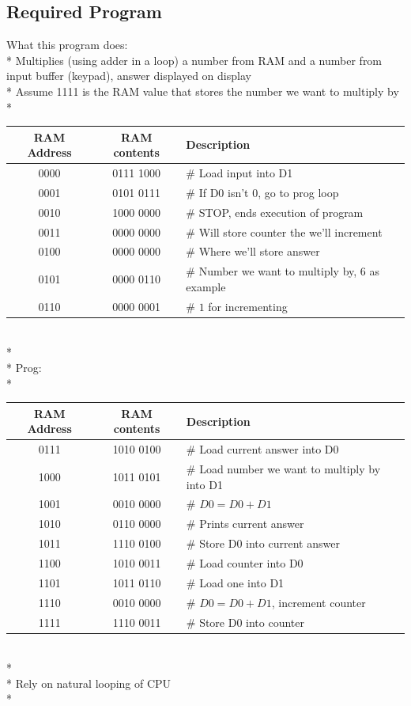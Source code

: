 \documentclass{article}
\begin{document}
	\subsection{Required Program}
	What this program does:
	\\*  Multiplies (using adder in a loop) a number from RAM and a number from input buffer (keypad), answer displayed on display
	\\* Assume 1111 is the RAM value that stores the number we want to multiply by
	\\*
	\begin{tabular}{|c|c|l|}
	\hline \textbf{RAM Address} & \textbf{RAM contents} & \textbf{Description}
	\\* \hline 	0000	& 0111 1000 & \# Load input into D1
	\\* \hline 	0001	& 0101 0111 & \# If D0 isn't $0$, go to prog loop
	\\* \hline 	0010	& 1000 0000 & \# STOP, ends execution of program
	\\* \hline 	0011	& 0000 0000 & \# Will store counter the we'll increment
	\\* \hline 	0100	& 0000 0000 & \# Where we'll store answer
	\\* \hline 	0101	& 0000 0110 & \# Number we want to multiply by, 6 as example
	\\* \hline 	0110	& 0000 0001 & \# $1$ for incrementing
	\\ \hline
	\end{tabular}
	\\*
	\\* Prog:
	\\*
	\begin{tabular}{|c|c|l|}
	\hline \textbf{RAM Address} & \textbf{RAM contents} & \textbf{Description}
	\\* \hline 	0111	& 1010 0100 & \# Load current answer into D0
	\\* \hline 	1000	& 1011 0101 & \# Load number we want to multiply by into D1
	\\* \hline 	1001	& 0010 0000 & \# $D0=D0+D1$
	\\* \hline 	1010	& 0110 0000 & \# Prints current answer
	\\* \hline 	1011	& 1110 0100 & \# Store D0 into current answer
	\\* \hline 	1100	& 1010 0011 & \# Load counter into D0
	\\* \hline 	1101	& 1011 0110 & \# Load one into D1
	\\* \hline 	1110	& 0010 0000 & \# $D0=D0+D1$, increment counter
	\\* \hline 	1111	& 1110 0011 & \# Store D0 into counter
	\\ \hline
	\end{tabular}
	\\*
	\\* Rely on natural looping of CPU
	\\*
\end{document}
